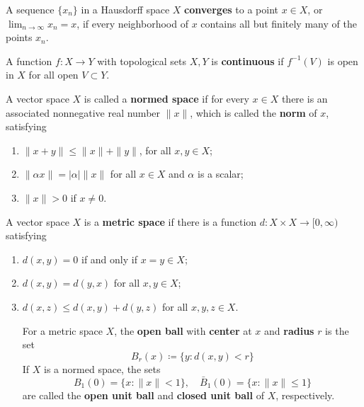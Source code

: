 \begin{defn} A sequence $\{x_n\}$ in a Hausdorff space $X$ \textbf{converges} to a point $x\in X$, or $\lim_{n\rightarrow \infty} x_n=x$, if every neighborhood of $x$ contains all but finitely many of the points $x_n$.
\end{defn}

\begin{defn} A function $f:X\rightarrow Y$ with topological sets $X,Y$ is \textbf{continuous} if $f^{-1}(V)$ is open in $X$ for all open $V\subset Y$.
\end{defn}

\begin{defn} A vector space $X$ is called a \textbf{normed space} if for every $x\in X$ there is an associated nonnegative real number $\|x\|$, which is called the \textbf{norm} of $x$, satisfying
\begin{enumerate}
\item $\|x+y\|\leq \|x\|+\|y\|$, for all $x,y\in X$;
\item $\|\alpha x\|=|\alpha| \|x\|$ for all $x\in X$ and $\alpha$ is a scalar;
\item $\|x\|>0$ if $x\neq 0$.
\end{enumerate}
A vector space $X$ is a \textbf{metric space} if there is a function $d:X\times X\rightarrow [0,\infty)$ satisfying
\begin{enumerate}
\item $d(x,y)=0$ if and only if $x=y\in X$;
\item $d(x,y)=d(y,x)$ for all $x,y\in X$;
\item $d(x,z)\leq d(x,y)+d(y,z)$ for all $x,y,z\in X$.

For a metric space $X$, the \textbf{open ball} with \textbf{center} at $x$ and \textbf{radius} $r$ is the set
\begin{equation}
B_r(x)\coloneqq \{y:d(x,y)<r\}
\end{equation}
If $X$ is a normed space, the sets
\begin{equation}
B_1(0)=\{x:\|x\|<1\},\quad \bar{B}_1(0)=\{x:\|x\|\leq 1\}
\end{equation}
are called the \textbf{open unit ball} and \textbf{closed unit ball} of $X$, respectively.
\end{enumerate}
\end{defn}

